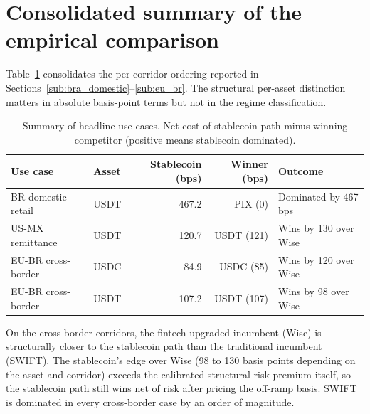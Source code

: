 \section{Consolidated summary of the empirical comparison}\label{app:empirical_summary}

Table~\ref{tab:summary_uc} consolidates the per-corridor ordering reported in Sections~\ref{sub:bra_domestic}--\ref{sub:eu_br}. The structural per-asset distinction matters in absolute basis-point terms but not in the regime classification.

\begin{table}[H]
\centering
\caption{Summary of headline use cases. Net cost of stablecoin path minus winning competitor (positive means stablecoin dominated).}\label{tab:summary_uc}
\begin{tabular}{llrrl}
\toprule
Use case & Asset & Stablecoin (bps) & Winner (bps) & Outcome \\
\midrule
BR domestic retail    & USDT & 467.2 & PIX (0)          & Dominated by 467 bps \\
US-MX remittance      & USDT & 120.7 & USDT (121)       & Wins by 130 over Wise \\
EU-BR cross-border    & USDC & 84.9  & USDC (85)        & Wins by 120 over Wise \\
EU-BR cross-border    & USDT & 107.2 & USDT (107)       & Wins by 98 over Wise \\
\bottomrule
\end{tabular}
\end{table}

On the cross-border corridors, the fintech-upgraded incumbent (Wise) is structurally closer to the stablecoin path than the traditional incumbent (SWIFT). The stablecoin's edge over Wise (98 to 130 basis points depending on the asset and corridor) exceeds the calibrated structural risk premium itself, so the stablecoin path still wins net of risk after pricing the off-ramp basis. SWIFT is dominated in every cross-border case by an order of magnitude.
